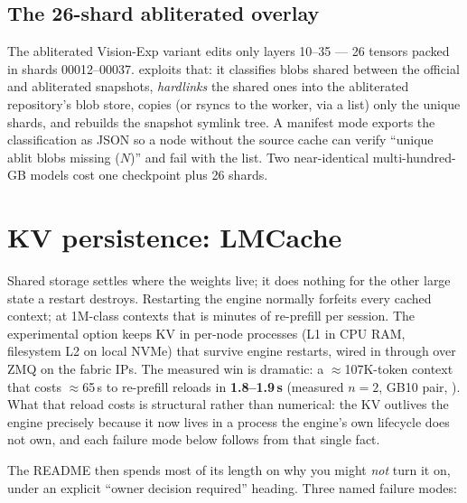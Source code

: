 \subsection{The 26-shard abliterated overlay}
\label{sec:scale-ablit-overlay}

The abliterated Vision-Exp variant edits only layers 10--35
 --- 26 tensors packed in shards 00012--00037.
 exploits that:
it classifies blobs shared between the official and abliterated snapshots,
\emph{hardlinks} the shared ones into the abliterated repository's blob store,
copies (or rsyncs to the worker, via a  list) only the
unique shards, and rebuilds the snapshot symlink tree. A manifest mode
exports the classification as JSON so a node without the source cache can
verify ``unique ablit blobs missing ($N$)'' and fail with the list. Two
near-identical multi-hundred-GB models cost one checkpoint plus 26 shards.

\section{KV persistence: LMCache}

Shared storage settles where the weights live; it does nothing for the
other large state a restart destroys. Restarting the engine normally
forfeits every cached context; at 1M-class
contexts that is minutes of re-prefill per session. The experimental
 option keeps KV in per-node 
processes (L1 in CPU RAM, filesystem L2 on local NVMe) that survive engine
restarts, wired in through  over ZMQ on the fabric
IPs. The measured win is dramatic: a $\approx$107K-token context that costs
$\approx$65\,s to re-prefill reloads in \textbf{1.8--1.9\,s} (measured
$n{=}2$, GB10 pair, ). What that reload costs is
structural rather than numerical: the KV outlives the engine precisely
because it now lives in a process the engine's own lifecycle does not own,
and each failure mode below follows from that single fact.

The README then spends most of its length on why you might \emph{not} turn it
on, under an explicit ``owner decision required'' heading. Three named
failure modes:

